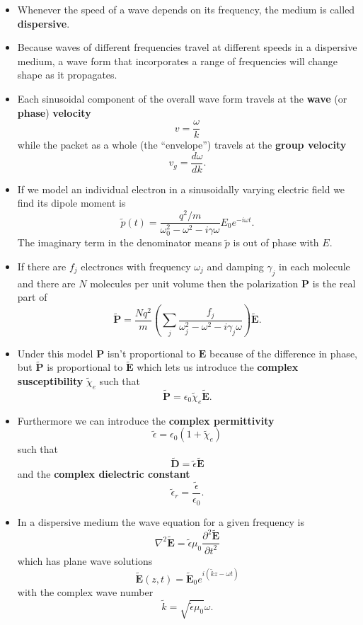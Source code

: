 \documentclass{article}
\renewcommand{\vec}[1]{\boldsymbol{\mathbf{#1}}}
\newcommand{\tvec}[1]{\tilde{\vec{#1}}}
\begin{document}
\begin{itemize}
  \item Whenever the speed of a wave depends on its frequency, the medium is called \textbf{dispersive}.

  \item Because waves of different frequencies travel at different speeds in a dispersive medium, a wave form that incorporates a range of frequencies will change shape as it propagates.

  \item Each sinusoidal component of the overall wave form travels at the \textbf{wave} (or \textbf{phase}) \textbf{velocity} \[v = \frac{\omega}{k}\] while the packet as a whole (the ``envelope'') travels at the \textbf{group velocity} \[v_g = \frac{d \omega}{d k}.\]

  \item If we model an individual electron in a sinusoidally varying electric field we find its dipole moment is \[\tilde{p}(t) = \frac{q^2 / m}{\omega_0^2 - \omega^2 - i \gamma \omega} E_0 e^{-i \omega t}.\] The imaginary term in the denominator means $\tilde{p}$ is out of phase with $E$.

  \item If there are $f_j$ electroncs with frequency $\omega_j$ and damping $\gamma_j$ in each molecule and there are $N$ molecules per unit volume then the polarization $\vec{P}$ is the real part of \[\tvec{P} = \frac{N q^2}{m} \left( \sum_j \frac{f_j}{\omega_j^2 - \omega^2 - i \gamma_j \omega} \right) \tvec{E}.\]

  \item Under this model $\vec{P}$ isn't proportional to $\vec{E}$ because of the difference in phase, but $\tvec{P}$ is proportional to $\tvec{E}$ which lets us introduce the \textbf{complex susceptibility} $\tilde{\chi}_e$ such that \[\tvec{P} = \epsilon_0 \tilde{\chi}_e \tvec{E}.\]

  \item Furthermore we can introduce the \textbf{complex permittivity} \[\tilde{\epsilon} = \epsilon_0 (1 + \tilde{\chi}_e)\] such that \[\tvec{D} = \tilde{\epsilon} \tvec{E}\] and the \textbf{complex dielectric constant} \[\tilde{\epsilon}_r = \frac{\tilde{\epsilon}}{\epsilon_0}.\]

  \item In a dispersive medium the wave equation for a given frequency is \[\nabla^2 \tvec{E} = \tilde{\epsilon} \mu_0 \frac{\partial^2 \tvec{E}}{\partial t^2}\] which has plane wave solutions \[\tvec{E}(z, t) = \tvec{E}_0 e^{i (\tilde{k} z - \omega t)}\] with the complex wave number \[\tilde{k} = \sqrt{\tilde{\epsilon} \mu_0} \omega.\]


\end{itemize}
\end{document}
